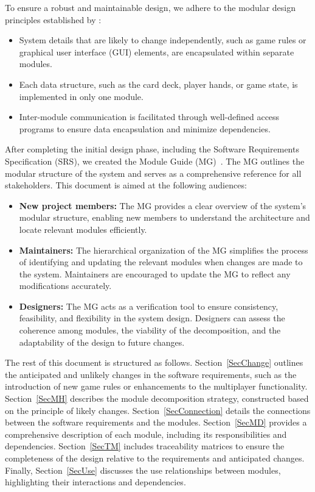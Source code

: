\documentclass[12pt, titlepage]{article}
\begin{document}
To ensure a robust and maintainable design, we adhere to the modular design principles established by \citet{ParnasEtAl1984}:

\begin{itemize}
\item System details that are likely to change independently, such as game rules or graphical user interface (GUI) elements, are encapsulated within separate modules.
\item Each data structure, such as the card deck, player hands, or game state, is implemented in only one module.
\item Inter-module communication is facilitated through well-defined access programs to ensure data encapsulation and minimize dependencies.
\end{itemize}

After completing the initial design phase, including the Software Requirements Specification (SRS), we created the Module Guide (MG)~\citep{ParnasEtAl1984}. The MG outlines the modular structure of the system and serves as a comprehensive reference for all stakeholders. This document is aimed at the following audiences:

\begin{itemize}
\item \textbf{New project members:} The MG provides a clear overview of the system's modular structure, enabling new members to understand the architecture and locate relevant modules efficiently.
\item \textbf{Maintainers:} The hierarchical organization of the MG simplifies the process of identifying and updating the relevant modules when changes are made to the system. Maintainers are encouraged to update the MG to reflect any modifications accurately.
\item \textbf{Designers:} The MG acts as a verification tool to ensure consistency, feasibility, and flexibility in the system design. Designers can assess the coherence among modules, the viability of the decomposition, and the adaptability of the design to future changes.
\end{itemize}

The rest of this document is structured as follows. Section~\ref{SecChange} outlines the anticipated and unlikely changes in the software requirements, such as the introduction of new game rules or enhancements to the multiplayer functionality. Section~\ref{SecMH} describes the module decomposition strategy, constructed based on the principle of likely changes. Section~\ref{SecConnection} details the connections between the software requirements and the modules. Section~\ref{SecMD} provides a comprehensive description of each module, including its responsibilities and dependencies. Section~\ref{SecTM} includes traceability matrices to ensure the completeness of the design relative to the requirements and anticipated changes. Finally, Section~\ref{SecUse} discusses the use relationships between modules, highlighting their interactions and dependencies.
\end{document}

